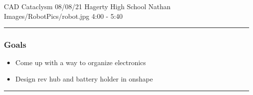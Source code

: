 \insertmeeting 
	{CAD Cataclysm} 
	{08/08/21}
	{Hagerty High School}
	{Nathan}
	{Images/RobotPics/robot.jpg}
	{4:00 - 5:40}
	
\noindent\hfil\rule{\textwidth}{.4pt}\hfil
\subsubsection*{Goals}
\begin{itemize}
    \item Come up with a way to organize electronics
    \item Design rev hub and battery holder in onshape
  

\end{itemize} 

\noindent\hfil\rule{\textwidth}{.4pt}\hfil

